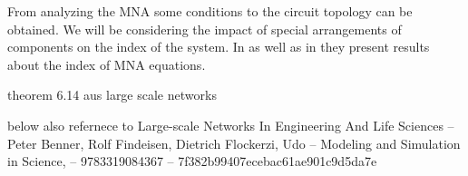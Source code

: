 %
%
%
%
%
%	
%
%


From analyzing the MNA some conditions to the circuit topology can be obtained. We will be considering the impact of special arrangements of components on the index of the system. In \cite{Tischendorf2005Topological} as well as in \cite{shashkov_tuprints27452} they present results about the index of MNA equations.


theorem 6.14 aus large scale networks

below also refernece to Large-scale Networks In Engineering And Life Sciences -- Peter Benner, Rolf Findeisen, Dietrich Flockerzi, Udo -- Modeling and Simulation in Science, -- 9783319084367 -- 7f382b99407ecebac61ae901c9d5da7e

